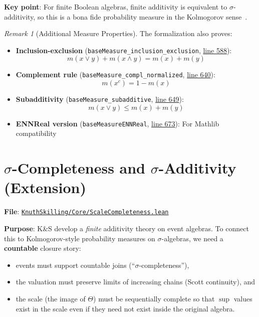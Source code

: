 \documentclass[11pt]{article}
\theoremstyle{definition}
\theoremstyle{remark}
\newtheorem{remark}[theorem]{Remark}
\begin{document}
\textbf{Key point}: For finite Boolean algebras, finite additivity is equivalent to $\sigma$-additivity, so this is a bona fide probability measure in the Kolmogorov sense~\cite{Kolmogorov1933}.

\begin{remark}[Additional Measure Properties]
The formalization also proves:
\begin{itemize}
\item \textbf{Inclusion-exclusion} (\texttt{baseMeasure\_inclusion\_exclusion}, \href{https://github.com/zariuq/ks-foundations-of-inference/blob/main/KnuthSkilling/Probability/ConditionalProbability/Basic.lean\#L588}{line 588}):
  \[ m(x \vee y) + m(x \wedge y) = m(x) + m(y) \]
\item \textbf{Complement rule} (\texttt{baseMeasure\_compl\_normalized}, \href{https://github.com/zariuq/ks-foundations-of-inference/blob/main/KnuthSkilling/Probability/ConditionalProbability/Basic.lean\#L640}{line 640}):
  \[ m(x^c) = 1 - m(x) \]
\item \textbf{Subadditivity} (\texttt{baseMeasure\_subadditive}, \href{https://github.com/zariuq/ks-foundations-of-inference/blob/main/KnuthSkilling/Probability/ConditionalProbability/Basic.lean\#L649}{line 649}):
  \[ m(x \vee y) \leq m(x) + m(y) \]
\item \textbf{ENNReal version} (\texttt{baseMeasureENNReal}, \href{https://github.com/zariuq/ks-foundations-of-inference/blob/main/KnuthSkilling/Probability/ConditionalProbability/Basic.lean\#L673}{line 673}): For Mathlib compatibility
\end{itemize}
\end{remark}

\section{$\sigma$-Completeness and $\sigma$-Additivity (Extension)}

\textbf{File}: \href{https://github.com/zariuq/ks-foundations-of-inference/blob/main/KnuthSkilling/Core/ScaleCompleteness.lean}{\texttt{KnuthSkilling/Core/ScaleCompleteness.lean}}

\textbf{Purpose}: K\&S develop a \emph{finite} additivity theory on event algebras.  To connect this to
Kolmogorov-style probability measures on $\sigma$-algebras, we need a \textbf{countable} closure story:
\begin{itemize}
\item events must support countable joins (``$\sigma$-completeness''),
\item the valuation must preserve limits of increasing chains (Scott continuity), and
\item the scale (the image of $\Theta$) must be sequentially complete so that $\sup$ values exist in the
scale even if they need not exist inside the original algebra.
\end{itemize}
\end{document}

